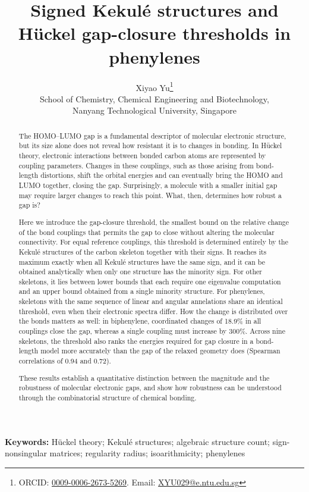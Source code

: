 \documentclass[11pt]{article}
\title{Signed Kekul\'e structures and H\"uckel gap-closure thresholds in phenylenes}
\author{Xiyao Yu\thanks{ORCID: \href{https://orcid.org/0009-0006-2673-5269}{0009-0006-2673-5269}. Email: \href{mailto:XYU029@e.ntu.edu.sg}{XYU029@e.ntu.edu.sg}}\\[2pt]
{\small School of Chemistry, Chemical Engineering and Biotechnology,}\\
{\small Nanyang Technological University, Singapore}}
\date{}
\begin{document}
\maketitle

\begin{abstract}
The HOMO--LUMO gap is a fundamental descriptor of molecular electronic structure, but its size alone does not reveal how resistant it is to changes in bonding. In H\"uckel theory, electronic interactions between bonded carbon atoms are represented by coupling parameters. Changes in these couplings, such as those arising from bond-length distortions, shift the orbital energies and can eventually bring the HOMO and LUMO together, closing the gap. Surprisingly, a molecule with a smaller initial gap may require larger changes to reach this point. What, then, determines how robust a gap is?

Here we introduce the gap-closure threshold, the smallest bound on the relative change of the bond couplings that permits the gap to close without altering the molecular connectivity. For equal reference couplings, this threshold is determined entirely by the Kekul\'e structures of the carbon skeleton together with their signs. It reaches its maximum exactly when all Kekul\'e structures have the same sign, and it can be obtained analytically when only one structure has the minority sign. For other skeletons, it lies between lower bounds that each require one eigenvalue computation and an upper bound obtained from a single minority structure. For phenylenes, skeletons with the same sequence of linear and angular annelations share an identical threshold, even when their electronic spectra differ. How the change is distributed over the bonds matters as well: in biphenylene, coordinated changes of 18.9\% in all couplings close the gap, whereas a single coupling must increase by 300\%. Across nine skeletons, the threshold also ranks the energies required for gap closure in a bond-length model more accurately than the gap of the relaxed geometry does (Spearman correlations of 0.94 and 0.72).

These results establish a quantitative distinction between the magnitude and the robustness of molecular electronic gaps, and show how robustness can be understood through the combinatorial structure of chemical bonding.
\end{abstract}

\noindent\textbf{Keywords:} H\"uckel theory; Kekul\'e structures; algebraic structure count; sign-nonsingular matrices; regularity radius; isoarithmicity; phenylenes
\end{document}
